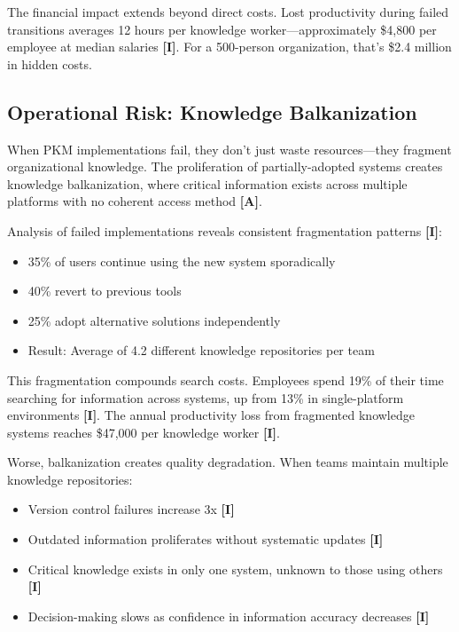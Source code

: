 \documentclass[a4paper,11pt]{article}
\newcommand{\ilabel}{\textbf{\textcolor{icolor}{[I]}}}
\newcommand{\alabel}{\textbf{\textcolor{acolor}{[A]}}}
\begin{document}
The financial impact extends beyond direct costs. Lost productivity during failed transitions averages 12 hours per knowledge worker—approximately \$4,800 per employee at median salaries \ilabel{}. For a 500-person organization, that's \$2.4 million in hidden costs.


\subsection{Operational Risk: Knowledge Balkanization}

When PKM implementations fail, they don't just waste resources—they fragment organizational knowledge. The proliferation of partially-adopted systems creates knowledge balkanization, where critical information exists across multiple platforms with no coherent access method \alabel{}.


Analysis of failed implementations reveals consistent fragmentation patterns \ilabel{}:


\begin{itemize}
  \item 35\% of users continue using the new system sporadically
  \item 40\% revert to previous tools
  \item 25\% adopt alternative solutions independently
  \item Result: Average of 4.2 different knowledge repositories per team
\end{itemize}

This fragmentation compounds search costs. Employees spend 19\% of their time searching for information across systems, up from 13\% in single-platform environments \ilabel{}. The annual productivity loss from fragmented knowledge systems reaches \$47,000 per knowledge worker \ilabel{}.


Worse, balkanization creates quality degradation. When teams maintain multiple knowledge repositories:

\begin{itemize}
  \item Version control failures increase 3x \ilabel{}
  \item Outdated information proliferates without systematic updates \ilabel{}
  \item Critical knowledge exists in only one system, unknown to those using others \ilabel{}
  \item Decision-making slows as confidence in information accuracy decreases \ilabel{}
\end{itemize}
\end{document}

